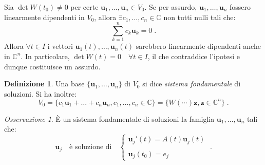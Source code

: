 \documentclass[a4paper,12pt]{report}
\theoremstyle{plain}
\theoremstyle{definition}
\newtheorem{defn}{Definizione}[section]
\theoremstyle{remark}
\newtheorem{oss}{Osservazione}[section]
\numberwithin{equation}{section}
\begin{document}
Sia $\det W(t_0) \ne 0$ per certe $\mathbf{u}_1,\ldots,\mathbf{u}_n \in V_0$. Se per assurdo, $\mathbf{u}_1,\ldots,\mathbf{u}_n$ fossero 
linearmente dipendenti in $V_0$, allora $\exists c_1,\ldots,c_n \in \mathbb{C}$ non tutti nulli tali che:
\begin{equation}
\sum_{k=1}^n c_k \mathbf{u}_k =0\;.
\end{equation}
Allora $\forall t \in I$ i vettori $\mathbf{u}_1(t),\ldots,\mathbf{u}_n(t)$ sarebbero linearmente dipendenti anche in $\mathbb{C}^n$. In 
particolare, $\det W(t)=0 \quad \forall t \in I$, il che contraddice l'ipotesi e dunque costituisce un assurdo.
\endproof
\begin{defn} Una base $\{\mathbf{u}_1,\ldots,\mathbf{u}_n\}$ di $V_0$ si dice \textit{sistema fondamentale} di soluzioni. Si ha inoltre:
\begin{equation}
V_0=\{c_1\mathbf{u}_1+\ldots+c_n\mathbf{u}_n, c_1,\ldots,c_n \in \mathbb{C}\}=\{W(\cdots) \mathbf{z}, \mathbf{z} \in \mathbb{C}
^n\}\;.
\end{equation}
\end{defn}
\begin{oss} È un sistema fondamentale di soluzioni la famiglia $\mathbf{u}_1,\ldots,\mathbf{u}_n$ tali che:
\begin{equation}
\mathbf{u}_j \quad \mbox{è soluzione di} \quad
\begin{cases}
 \mathbf{u}_j'(t)=A(t)\mathbf{u}_j(t) \\
 \\
 \mathbf{u}_j(t_0)=e_j
\end{cases}\;.
\end{equation}
\end{oss}
\end{document}
